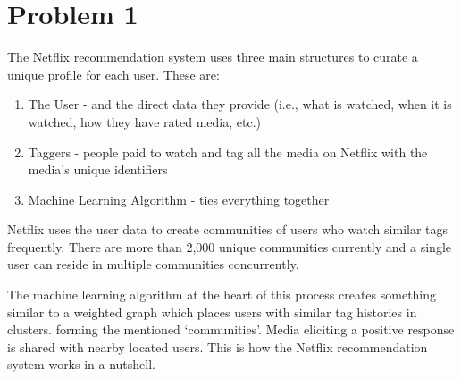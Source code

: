 \documentclass[12pt,letterpaper]{article}
\begin{document}
\section*{Problem 1}

The Netflix recommendation system uses three main structures to curate a unique profile for each user. These are:
\begin{enumerate}
  \item
   The User - and the direct data they provide (i.e., what is watched, when it is watched, how they have rated media, etc.)
  \item
    Taggers - people paid to watch and tag all the media on Netflix with the media's unique identifiers
  \item
    Machine Learning Algorithm - ties everything together
\end{enumerate}
 
 Netflix uses the user data to create communities of users who watch similar tags frequently. There are more than 2,000 unique communities currently and a single user can reside in multiple communities concurrently. 
 
 The machine learning algorithm at the heart of this process creates something similar to a weighted graph which places users with similar tag histories in clusters. forming the mentioned `communities'. Media eliciting a positive response is shared with nearby located users. This is how the Netflix recommendation system works in a nutshell.
 
%
%
%     
%    
%     
%
%
\end{document}
